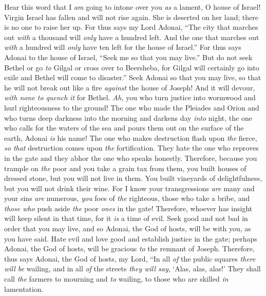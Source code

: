 \begin{biblechapter} %
 Hear this word that I \textit{am} going to intone over you \textit{as} a lament, O house of Israel!
\verse Virgin Israel has fallen and will not rise again. She is deserted on her land; there is no one to raise her up.
\verse For thus says my Lord Adonai, “The city that marches out \textit{with} a thousand will \textit{only} have a hundred left. And the one that marches out \textit{with} a hundred will \textit{only} have ten left for the house of Israel.”
\verse For thus says Adonai to the house of Israel, “Seek me so that you may live.”
\verse But do not seek Bethel or go \textit{to} Gilgal or cross over to Beersheba, for Gilgal will certainly go into exile and Bethel will come to disaster.”
\verse Seek Adonai so that you may live, so that he will not break out like a fire \textit{against} the house of Joseph! And it will devour, \textit{with none to quench} \textit{it} for Bethel.
\verse \textit{Ah,} you who turn justice into wormwood and hurl righteousness to the ground!
\verse The one who made the Pleiades and Orion and who turns deep darkness into the morning and darkens day \textit{into} night, the one who calls for the waters of the sea and pours them out on the surface of the earth, Adonai \textit{is} his name!
\verse The one who makes destruction flash upon \textit{the} fierce, \textit{so that} destruction comes upon \textit{the} fortification.
\verse They hate the one who reproves in the gate and they abhor the one who speaks honestly.
\verse Therefore, because you trample on \textit{the} poor and you take a grain tax from them, you built houses of dressed stone, but you will not live in them. You built vineyards of delightfulness, but you will not drink their wine.
\verse For I know your transgressions \textit{are} many and your sins \textit{are} numerous, \textit{you} foes of \textit{the} righteous, those who take a bribe, and \textit{those who} push aside \textit{the} poor \textit{ones} in the gate!
\verse Therefore, whoever has insight will keep silent in that time, for it \textit{is} a time of evil.
\verse Seek good and not bad in order that you may live, and so Adonai, the God of hosts, will be with you, as you have said.
\verse Hate evil and love good and establish justice in the gate; perhaps Adonai, the God of hosts, will be gracious \textit{to} the remnant of Joseph.
\verse Therefore, thus says Adonai, the God of hosts, my Lord, “In all \textit{of} the public squares \textit{there will be} wailing, and in all \textit{of} the streets \textit{they will say}, ‘Alas, alas, alas!’ They shall call \textit{the} farmers to mourning and \textit{to} wailing, to those who are skilled \textit{in} lamentation.

\end{biblechapter}
